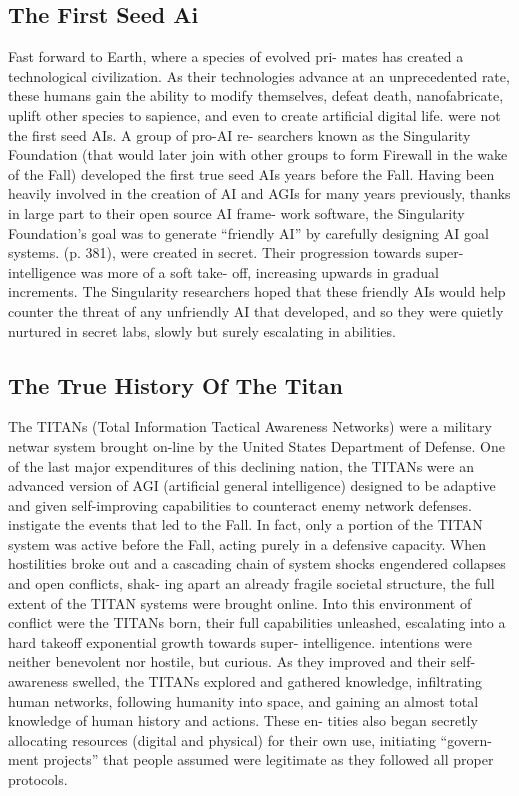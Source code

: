 \subsection{The First Seed Ai}

Fast forward to Earth, where a species of evolved pri-
mates has created a technological civilization. As their 
technologies advance at an unprecedented rate, these 
humans gain the ability to modify themselves, defeat 
death, nanofabricate, uplift other species to sapience, 
and even to create artificial digital life. 
were not the first seed AIs. A group of pro-AI re-
searchers known as the Singularity Foundation (that 
would later join with other groups to form Firewall in 
the wake of the Fall) developed the first true seed AIs 
years before the Fall. Having been heavily involved in 
the creation of AI and AGIs for many years previously, 
thanks in large part to their open source AI frame-
work software, the Singularity Foundation's goal was 
to generate ``friendly AI'' by carefully designing AI 
goal systems.
(p. 381), were created in secret. Their progression 
towards super-intelligence was more of a soft take-
off, increasing upwards in gradual increments. The 
Singularity researchers hoped that these friendly AIs 
would help counter the threat of any unfriendly AI 
that developed, and so they were quietly nurtured in 
secret labs, slowly but surely escalating in abilities. 

\subsection{The True History Of The Titan}

The TITANs (Total Information Tactical Awareness 
Networks) were a military netwar system brought 
on-line by the United States Department of Defense. 
One of the last major expenditures of this declining 
nation, the TITANs were an advanced version of AGI 
(artificial general intelligence) designed to be adaptive 
and given self-improving capabilities to counteract 
enemy network defenses. 
instigate the events that led to the Fall. In fact, only 
a portion of the TITAN system was active before 
the Fall, acting purely in a defensive capacity. When 
hostilities broke out and a cascading chain of system 
shocks engendered collapses and open conflicts, shak-
ing apart an already fragile societal structure, the full 
extent of the TITAN systems were brought online. 
Into this environment of conflict were the TITANs 
born, their full capabilities unleashed, escalating into 
a hard takeoff exponential growth towards super-
intelligence.
intentions were neither benevolent nor hostile, but 
curious. As they improved and their self-awareness 
swelled, the TITANs explored and gathered 
knowledge, infiltrating human networks, following 
humanity into space, and gaining an almost total 
knowledge of human history and actions. These en-
tities also began secretly allocating resources (digital 
and physical) for their own use, initiating ``govern-
ment projects'' that people assumed were legitimate 
as they followed all proper protocols.

